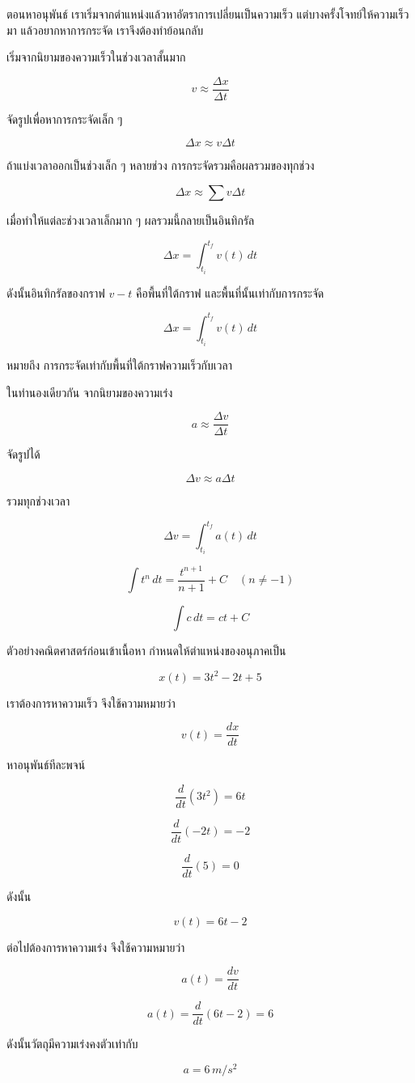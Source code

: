 \documentclass[12pt,a4paper]{report}
\begin{document}
ตอนหาอนุพันธ์ เราเริ่มจากตำแหน่งแล้วหาอัตราการเปลี่ยนเป็นความเร็ว แต่บางครั้งโจทย์ให้ความเร็วมา แล้วอยากหาการกระจัด เราจึงต้องทำย้อนกลับ

เริ่มจากนิยามของความเร็วในช่วงเวลาสั้นมาก

\[
v \approx \frac{\Delta x}{\Delta t}
\]

จัดรูปเพื่อหาการกระจัดเล็ก ๆ

\[
\Delta x \approx v\Delta t
\]

ถ้าแบ่งเวลาออกเป็นช่วงเล็ก ๆ หลายช่วง การกระจัดรวมคือผลรวมของทุกช่วง

\[
\Delta x \approx \sum v\Delta t
\]

เมื่อทำให้แต่ละช่วงเวลาเล็กมาก ๆ ผลรวมนี้กลายเป็นอินทิกรัล

\[
\Delta x = \int_{t_i}^{t_f} v(t)\,dt
\]

ดังนั้นอินทิกรัลของกราฟ $v-t$ คือพื้นที่ใต้กราฟ และพื้นที่นั้นเท่ากับการกระจัด

\begin{tcolorbox}[title=สรุปความหมายของอินทิกรัล]
\[
\Delta x = \int_{t_i}^{t_f} v(t)\,dt
\]

หมายถึง การกระจัดเท่ากับพื้นที่ใต้กราฟความเร็วกับเวลา
\end{tcolorbox}

ในทำนองเดียวกัน จากนิยามของความเร่ง

\[
a \approx \frac{\Delta v}{\Delta t}
\]

จัดรูปได้

\[
\Delta v \approx a\Delta t
\]

รวมทุกช่วงเวลา

\[
\Delta v = \int_{t_i}^{t_f} a(t)\,dt
\]

\begin{tcolorbox}[title=สูตรอินทิกรัลพื้นฐาน]
\[
\int t^n\,dt=\frac{t^{n+1}}{n+1}+C
\quad (n\neq -1)
\]

\[
\int c\,dt=ct+C
\]
\end{tcolorbox}

\begin{examplebox}{ตัวอย่างคณิตศาสตร์ก่อนเข้าเนื้อหา}
กำหนดให้ตำแหน่งของอนุภาคเป็น

\[
x(t)=3t^2-2t+5
\]

เราต้องการหาความเร็ว จึงใช้ความหมายว่า

\[
v(t)=\frac{dx}{dt}
\]

หาอนุพันธ์ทีละพจน์

\[
\frac{d}{dt}(3t^2)=6t
\]

\[
\frac{d}{dt}(-2t)=-2
\]

\[
\frac{d}{dt}(5)=0
\]

ดังนั้น

\[
v(t)=6t-2
\]

ต่อไปต้องการหาความเร่ง จึงใช้ความหมายว่า

\[
a(t)=\frac{dv}{dt}
\]

\[
a(t)=\frac{d}{dt}(6t-2)=6
\]

ดังนั้นวัตถุมีความเร่งคงตัวเท่ากับ

\[
a=6\,\si{m/s^2}
\]
\end{examplebox}
\end{document}
